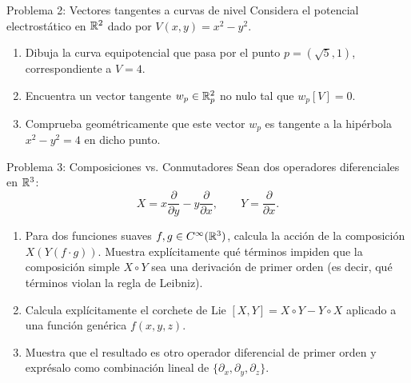 \documentclass[11pt,letterpaper]{article}
\begin{document}
\begin{infobox}{Problema 2: Vectores tangentes a curvas de nivel}
Considera el potencial electrostático en $\mathbb{R}^2$ dado por $V(x, y) = x^2 - y^2$.
\begin{enumerate}[label=\alph*)]
    \item Dibuja la curva equipotencial que pasa por el punto $p = (\sqrt{5}, 1)$, correspondiente a $V = 4$.
    \item Encuentra un vector tangente $w_p \in \mathbb{R}^2_p$ no nulo tal que $w_p[V] = 0$. 
    \item Comprueba geométricamente que este vector $w_p$ es tangente a la hipérbola $x^2 - y^2 = 4$ en dicho punto.
\end{enumerate}
\end{infobox}


\begin{infobox}{Problema 3: Composiciones vs. Conmutadores}
Sean dos operadores diferenciales en $\mathbb{R}^3$:
\[
X = x \frac{\partial}{\partial y} - y \frac{\partial}{\partial x}, \qquad Y = \frac{\partial}{\partial x}.
\]
\begin{enumerate}[label=\alph*)]
    \item Para dos funciones suaves $f, g \in C^\infty(\mathbb{R}^3)$, calcula la acción de la composición $X(Y(f \cdot g))$.
    Muestra explícitamente qué términos impiden que la composición simple $X \circ Y$ sea una derivación de primer orden (es decir, qué términos violan la regla de Leibniz).
    \item Calcula explícitamente el corchete de Lie $[X, Y] = X \circ Y - Y \circ X$ aplicado a una función genérica $f(x, y, z)$.
    \item Muestra que el resultado es otro operador diferencial de primer orden y exprésalo como combinación lineal de $\{\partial_x, \partial_y, \partial_z\}$.
\end{enumerate}
\end{infobox}
\end{document}
